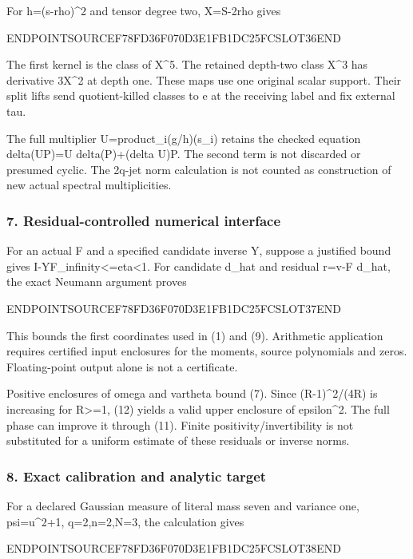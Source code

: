 For h=(s-rho)\^{}2 and tensor degree two, X=S-2rho gives

ENDPOINTSOURCEF78FD36F070D3E1FB1DC25FCSLOT36END

The first kernel is the class of X\^{}5. The retained depth-two class X\^{}3 has derivative 3X\^{}2 at depth one. These maps use one original scalar support. Their split lifts send quotient-killed classes to e at the receiving label and fix external tau.

The full multiplier U=product\_i(g/h)(s\_i) retains the checked equation delta(UP)=U delta(P)+(delta U)P. The second term is not discarded or presumed cyclic. The 2q-jet norm calculation is not counted as construction of new actual spectral multiplicities.

\subsubsection{7. Residual-controlled numerical interface}\label{endpoint-pr24_current_corrected--residual-controlled-numerical-interface}

For an actual F and a specified candidate inverse Y, suppose a justified bound gives \textbar\textbar I-YF\textbar\textbar\_infinity\textless=eta\textless1. For candidate d\_hat and residual r=v-F d\_hat, the exact Neumann argument proves

ENDPOINTSOURCEF78FD36F070D3E1FB1DC25FCSLOT37END

This bounds the first coordinates used in (1) and (9). Arithmetic application requires certified input enclosures for the moments, source polynomials and zeros. Floating-point output alone is not a certificate.

Positive enclosures of omega and vartheta bound (7). Since (R-1)\^{}2/(4R) is increasing for R\textgreater=1, (12) yields a valid upper enclosure of epsilon\^{}2. The full phase can improve it through (11). Finite positivity/invertibility is not substituted for a uniform estimate of these residuals or inverse norms.

\subsubsection{8. Exact calibration and analytic target}\label{endpoint-pr24_current_corrected--exact-calibration-and-analytic-target}

For a declared Gaussian measure of literal mass seven and variance one, psi=u\^{}2+1, q=2,n=2,N=3, the calculation gives

ENDPOINTSOURCEF78FD36F070D3E1FB1DC25FCSLOT38END

